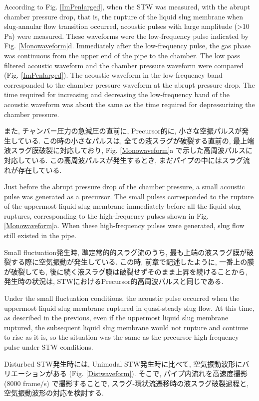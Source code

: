 \documentclass[12pt]{article}
\begin{document}
According to Fig. \ref{ImPenlarged}, when the STW was measured, with the abrupt chamber pressure drop, that is, the rupture of the liquid slug membrane when slug-annular flow transition occurred, acoustic pulses with large amplitude (>10 Pa) were measured.
These waveforms were the low-frequency pulse indicated by Fig. \ref{Monowaveform}d.
Immediately after the low-frequency pulse, the gas phase was continuous from the upper end of the pipe to the chamber.
The low pass filtered acoustic waveform and the chamber pressure waveform were compared (Fig. \ref{ImPenlarged}).
The acoustic waveform in the low-frequency band corresponded to the chamber pressure waveform at the abrupt pressure drop.
The time required for increasing and decreasing the low-frequency band of the acoustic waveform was about the same as the time required for depressurizing the chamber pressure.

また, チャンバー圧力の急減圧の直前に, Precursor的に, 小さな空振パルスが発生している. 
この時の小さなパルスは, 全ての液スラグが破裂する直前の, 最上端液スラグ膜破裂に対応しており, Fig. \ref{Monowaveform}a で示した高周波パルスに対応している. この高周波パルスが発生するとき, まだパイプの中にはスラグ流れが存在している. 

Just before the abrupt pressure drop of the chamber pressure, a small acoustic pulse was generated as a precursor.
The small pulses corresponded to the rupture of the uppermost liquid slug membrane immediately before all the liquid slug ruptures, corresponding to the high-frequency pulses shown in Fig. \ref{Monowaveform}a.
When these high-frequency pulses were generated, slug flow still existed in the pipe.

Small fluctuation発生時, 準定常的的スラグ流のうち, 最も上端の液スラグ膜が破裂する際に空気振動が発生している. この時, 前章で記述したように, 一番上の膜が破裂しても, 後に続く液スラグ膜は破裂せずそのまま上昇を続けることから, 発生時の状況は, STWにおけるPrecursor的高周波パルスと同じである.

Under the small fluctuation conditions, the acoustic pulse occurred when the uppermost liquid slug membrane ruptured in quasi-steady slug flow. 
At this time, as described in the previous, even if the uppermost liquid slug membrane ruptured, the subsequent liquid slug membrane would not rupture and continue to rise as it is, so the situation was the same as the precursor high-frequency pulse under STW conditions.

Disturbed STW発生時には, Unimodal STW発生時に比べて, 空気振動波形にバリエーションがある (Fig. \ref{Distwaveform}). 
そこで, パイプ内流れを高速度撮影 (8000 frame/s) で撮影することで, スラグ-環状流遷移時の液スラグ破裂過程と, 空気振動波形の対応を検討する.
\end{document}
